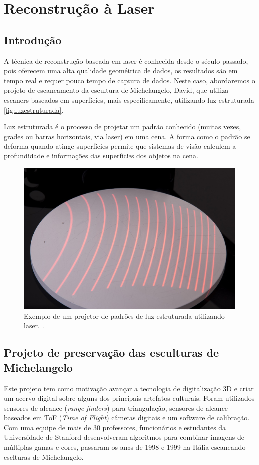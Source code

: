 \chapter{Reconstrução à Laser}\label{cap:laser}

\section{Introdução}

A técnica de reconstrução baseada em laser é conhecida desde o século passado, pois oferecem uma alta qualidade geométrica de dados, os resultados são em tempo real e requer pouco tempo de captura de dados. 
Neste caso, abordaremos o projeto de escaneamento da escultura de Michelangelo, David, que utiliza escaners baseados em superfícies, mais especificamente, utilizando luz estruturada \ref{fig:luzestruturada}.

Luz estruturada é o processo de projetar um padrão conhecido (muitas vezes, grades ou barras horizontais, via laser) em uma cena. A forma como o padrão se deforma quando atinge superfícies permite que sistemas de visão calculem a profundidade e informações das superfícies dos objetos na cena.

\begin{figure}[!h]
	\centering
	\includegraphics[width=0.5\linewidth]{figs/luzestruturada.jpg}
	\caption{%
	Exemplo de um projetor de padrões de luz estruturada utilizando laser.
	\cite{luzEstruturada}.
	}\label{fig:kinect}
\end{figure}

\section{Projeto de preservação das esculturas de Michelangelo}\label{sec:David}

Este projeto tem como motivação avançar a tecnologia de digitalização 3D e criar um acervo digital sobre alguns dos principais artefatos culturais. Foram utilizados sensores de alcance (\emph{range finders}) para triangulação, sensores de alcance baseados em ToF (\emph{Time of Flight}) câmeras digitais e um software de calibração. Com uma equipe de mais de 30 professores, funcionários e estudantes da Universidade de Stanford desenvolveram algoritmos para combinar imagens de múltiplas gamas e cores, passaram os anos de 1998 e 1999 na Itália escaneando esclturas de Michelangelo. 

